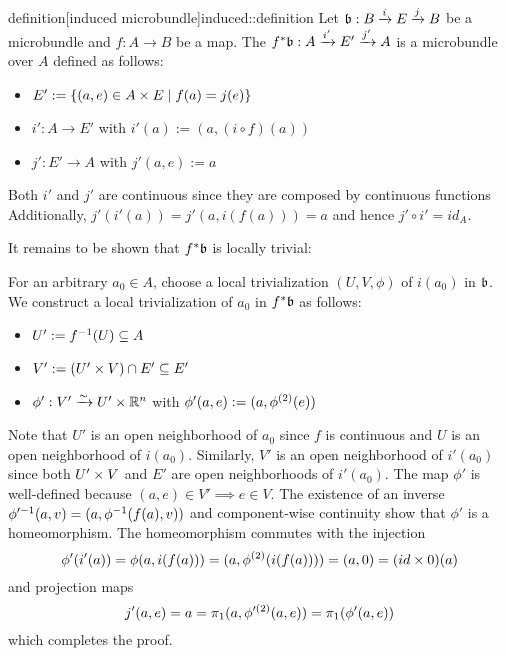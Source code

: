 \begin{mystatement}{definition}[induced microbundle]{induced::definition}
    Let $\bb: \bundle{B}{E}{i}{j}$ be a microbundle and $f: A \to B$ be a map.
    The  $\bundledef{\ind{f}\bb}{A}{E'}{i'}{j'}$
    is a microbundle over $A$ defined as follows:
    \begin{itemize}
        \item $E' := \{ (a, e) \in A \times E \mid f(a) = j(e) \}$
        \item $i': A \to E'$ with $i'(a) := (a, (i \circ f)(a))$
        \item $j': E' \to A$ with $j'(a, e) := a$
    \end{itemize}
\end{mystatement}

\begin{myproof}
    Both $i'$ and $j'$ are continuous since they are composed by continuous functions
    Additionally, $j'(i'(a)) = j'(a, i(f(a))) = a$ and hence $j' \circ i' = id_A$.

    It remains to be shown that $\ind{f}\bb$ is locally trivial:

    For an arbitrary $a_0 \in A$, choose a local trivialization $(U, V, \phi)$ of $i(a_0)$ in $\bb$.
    We construct a local trivialization of $a_0$ in $\ind{f}\bb$ as follows:
    \begin{itemize}
        \item $U' := f^{-1}(U) \subseteq{} A$
        \item $V' := (U' \times V) \cap E' \subseteq{} E'$
        \item $\phi': V' \xrightarrow{\sim} U' \times \mathbb{R}^n$ with $\phi'(a, e) := (a, \phi^{(2)}(e))$
    \end{itemize}
    Note that $U'$ is an open neighborhood of $a_0$ since $f$ is continuous and $U$ is an open neighborhood of $i(a_0)$.
    Similarly, $V'$ is an open neighborhood of $i'(a_0)$ since both $U' \times V$ and $E'$ are open neighborhoods of $i'(a_0)$.
    The map $\phi'$ is well-defined because $(a, e) \in V' \implies e \in V$.
    The existence of an inverse $\phi'^{-1}(a, v) = (a, \phi^{-1}(f(a), v))$ and component-wise continuity show that $\phi'$ is a homeomorphism.
    The homeomorphism commutes with the injection
    \[ \phi'(i'(a)) = \phi(a, i(f(a))) = (a, \phi^{(2)}(i(f(a)))) = (a, 0) = (id \times 0)(a) \]
    and projection maps
    \[ j'(a, e) = a  = \pi_1(a, \phi'^{(2)}(a, e)) = \pi_1(\phi'(a, e)) \]
    which completes the proof. 
\end{myproof}